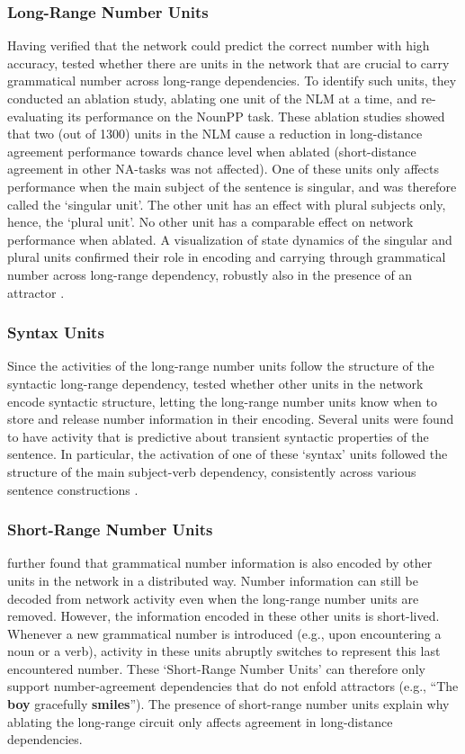\subsubsection{Long-Range Number Units}
Having verified that the network could predict the correct number with high accuracy, \citet{lakretz2019emergence} tested whether there are units in the network that are crucial to carry grammatical number across long-range dependencies.  
To identify such units, they conducted an ablation study, ablating one unit of the NLM at a time, and re-evaluating its performance on the NounPP task. 
These ablation studies showed that two (out of 1300) units in the NLM cause a reduction in long-distance agreement performance towards chance level when ablated (short-distance agreement in other NA-tasks was not affected). 
One of these units only affects performance when the main subject of the sentence is singular, and was therefore called the `singular unit'. 
The other unit has an effect with plural subjects only, hence, the `plural unit'. 
No other unit has a comparable effect on network performance when ablated. 
A visualization of state dynamics of the singular and plural units confirmed their role in encoding and carrying through grammatical number across long-range dependency, robustly also in the presence of an attractor \citep[Figure 1 in][]{lakretz2019emergence}.

\subsubsection{Syntax Units}
Since the activities of the long-range number units follow the structure of the syntactic long-range dependency, \citet{lakretz2019emergence} tested whether other units in the network encode syntactic structure, letting the long-range number units know when to store and release number information in their encoding. Several units were found to have activity that is predictive about transient syntactic properties of the sentence. In particular, the activation of one of these `syntax' units followed the structure of the main subject-verb dependency, consistently across various sentence constructions \citep[Figure 3 in][]{lakretz2019emergence}.

\subsubsection{Short-Range Number Units}
\citet{lakretz2019emergence} further found that grammatical number information is also encoded by other units in the network in a distributed way.
Number information can still be decoded from network activity even when the long-range number units are removed. 
However, the information encoded in these other units is short-lived. Whenever a new grammatical number  is
introduced (e.g., upon encountering a noun or a verb), activity in
these units abruptly switches to represent this last encountered
number. These `Short-Range Number Units' can therefore only support number-agreement dependencies that do not
enfold attractors (e.g., ``The \textbf{boy} gracefully
\textbf{smiles}''). The presence of short-range number units explain why ablating the long-range circuit only affects agreement in long-distance dependencies.

